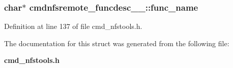 \subsubsection[{func\_\-name}]{\setlength{\rightskip}{0pt plus 5cm}char$\ast$ {\bf cmdnfsremote\_\-funcdesc\_\-\_\-::func\_\-name}}\label{structcmdnfsremote__funcdesc_____aac3f9774665e3e6a426fbfcbe719027f}


Definition at line 137 of file cmd\_\-nfstools.h.

The documentation for this struct was generated from the following file:\begin{DoxyCompactItemize}
\item 
{\bf cmd\_\-nfstools.h}\end{DoxyCompactItemize}
